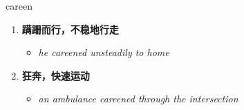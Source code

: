 
\begin{frame}
{\huge careen}
\begin{center}
\begin{enumerate}\Large
  \item \textbf{蹒跚而行，不稳地行走}
  \begin{itemize}
    \item \em{\Large{he careened unsteadily to home}}
  \end{itemize}
  \item \textbf{狂奔，快速运动}
  \begin{itemize}
    \item \em{\Large{an ambulance careened through the intersection}}
  \end{itemize}
\end{enumerate}
\end{center}
\end{frame}
